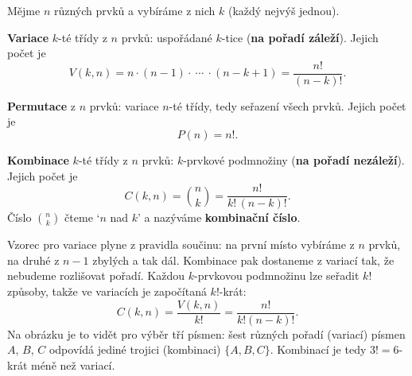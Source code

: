 \begin{definitionbox}
  Mějme $n$ různých prvků a vybíráme z nich $k$ (každý nejvýš jednou).

  \vspace{0.2cm}

  \textbf{Variace} $k$-té třídy z $n$ prvků: uspořádané $k$-tice (\textbf{na pořadí záleží}). Jejich počet je
  \begin{equation*}
    V(k, n) = n\cdot(n - 1)\cdot\ \cdots\ \cdot(n - k + 1) = \frac{n!}{(n - k)!}.
  \end{equation*}

  \textbf{Permutace} z $n$ prvků: variace $n$-té třídy, tedy seřazení všech prvků. Jejich počet je
  \begin{equation*}
    P(n) = n!.
  \end{equation*}

  \textbf{Kombinace} $k$-té třídy z $n$ prvků: $k$-prvkové podmnožiny (\textbf{na pořadí nezáleží}). Jejich počet je
  \begin{equation*}
    C(k, n) = \binom{n}{k} = \frac{n!}{k!\,(n - k)!}.
  \end{equation*}
  Číslo $\binom{n}{k}$ čteme `$n$ nad $k$' a nazýváme \textbf{kombinační číslo}.
\end{definitionbox}

Vzorec pro variace plyne z pravidla součinu: na první místo vybíráme z $n$ prvků, na druhé z $n - 1$ zbylých a tak dál. Kombinace pak dostaneme z variací tak, že nebudeme rozlišovat pořadí. Každou $k$-prvkovou podmnožinu lze seřadit $k!$ způsoby, takže ve variacích je započítaná $k!$-krát:
\begin{equation*}
  C(k, n) = \frac{V(k, n)}{k!} = \frac{n!}{k!(n - k)!}.
\end{equation*}
Na obrázku je to vidět pro výběr tří písmen: šest různých pořadí (variací) písmen $A$, $B$, $C$ odpovídá jediné trojici (kombinaci) $\{A, B, C\}$. Kombinací je tedy $3! = 6$-krát méně než variací.
\begin{center}
\end{center}

